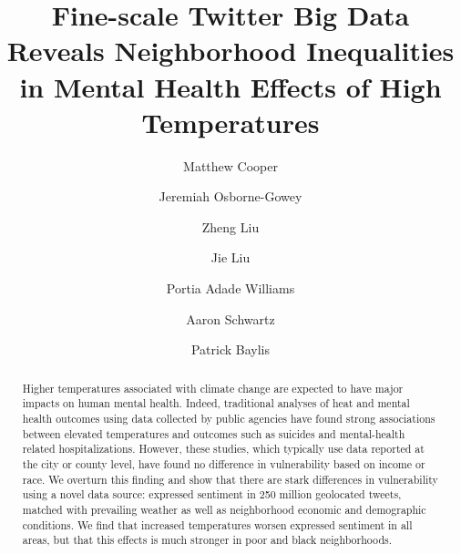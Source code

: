 \documentclass{article}
\begin{document}
\title{Fine-scale Twitter Big Data Reveals Neighborhood Inequalities in Mental Health Effects of High Temperatures}

\author[1, *]{Matthew Cooper}
\author[2]{Jeremiah Osborne-Gowey}
\author[3]{Zheng Liu}
\author[4]{Jie Liu}
\author[5]{Portia Adade Williams}
\author[6]{Aaron Schwartz}
\author[7]{Patrick Baylis}


\maketitle

\begin{abstract}
Higher temperatures associated with climate change are expected to have major impacts on human mental health.  Indeed, traditional analyses of heat and mental health outcomes using data collected by public agencies have found strong associations between elevated temperatures and outcomes such as suicides and mental-health related hospitalizations.  However, these studies, which typically use data reported at the city or county level, have found no difference in vulnerability based on income or race.  We overturn this finding and show that there are stark differences in vulnerability using a novel data source: expressed sentiment in 250 million geolocated tweets, matched with prevailing weather as well as neighborhood economic and demographic conditions.  We find that increased temperatures worsen expressed sentiment in all areas, but that this effects is much stronger in poor and black neighborhoods.

\end{abstract}
\end{document}
